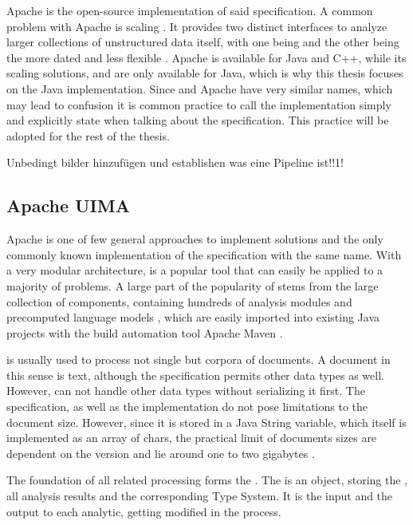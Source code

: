 Apache \uima{} is the open-source implementation of said \uima{} specification. A common problem with Apache \uima{} is scaling \cite{divita2015scaling,epstein2012making,ramakrishnan2010building}. It  provides two distinct interfaces to analyze larger collections of unstructured data itself, with one being \uimaas{} and the other being the more dated and less flexible \cpe{} \cite{OASIS:UIMA:2009}.
Apache \uima{} is available for Java and C++, while its scaling solutions, \uimacpe{} and \uimaas{} are only available for Java, which is why this thesis focuses on the Java implementation. Since \uima{} and Apache \uima{} have very similar names, which may lead to confusion it is common practice to call the implementation simply \uima{} and explicitly state when talking about the specification. This practice will be adopted for the rest of the thesis.




Unbedingt bilder hinzufügen und establishen was eine Pipeline ist!!1!

\subsection{Apache UIMA}

Apache \uima{} is one of few general approaches to implement \nlp{} solutions and the only commonly known implementation of the specification with the same name. With a very modular architecture, \uima{} is a popular tool that can easily be applied to a majority of \nlp{} problems. A large part of the popularity of \uima{} stems from the large \dkpro{} collection of components, containing hundreds of analysis modules and precomputed language models \cite{eckartdecastilho-gurevych:2014:OIAF4HLT}, which are easily imported into existing Java projects with the build automation tool Apache Maven \cite{dkpro}.

\uima{} is usually used to process not single but corpora of documents. A document in this sense is text, although the \uima{} specification permits other data types as well. However, \uima{} can not handle other data types without serializing it first. The \uima{} specification, as well as the implementation do not pose limitations to the document size. However, since it is stored in a Java String variable, which itself is implemented as an array of chars, the practical limit of documents sizes are dependent on the \jvm{} version and lie around one to two gigabytes \cite{so:javastrings}.

The foundation of all \uima{} related processing forms the \cas{}. The \cas{} is an object, storing the \sofa{}, all analysis results and the corresponding Type System. It is the input and the output to each analytic, getting modified in the process.

